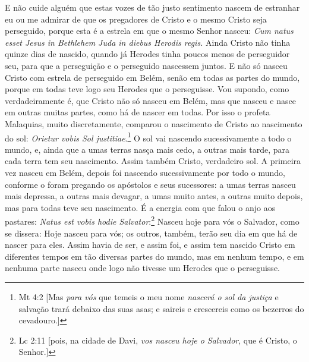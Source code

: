 E não cuide alguém que estas vozes de tão justo sentimento nascem de
estranhar eu ou me admirar de que os pregadores de Cristo e o mesmo
Cristo seja perseguido, porque esta é a estrela em que o mesmo Senhor
nasceu: \emph{Cum natus esset Jesus in Bethlehem Juda in diebus Herodis
regis.} Ainda Cristo não tinha quinze dias de nascido, quando já Herodes
tinha poucos menos de perseguidor seu, para que a perseguição e o
perseguido nascessem juntos. E não só nasceu Cristo com estrela de
perseguido em Belém, senão em todas as partes do mundo, porque em todas
teve logo seu Herodes que o perseguisse. Vou supondo, como
verdadeiramente é, que Cristo não só nasceu em Belém, mas que nasceu e
nasce em outras muitas partes, como há de nascer em todas. Por isso o
profeta Malaquias, muito discretamente, comparou o nascimento de Cristo
ao nascimento do sol: \emph{Orietur vobis Sol justitiae}.\footnote{Mt 4:2 [Mas \emph{para vós} que temeis o meu nome \emph{nascerá o sol da justiça} e salvação trará debaixo das
suas asas; e saireis e crescereis como os bezerros do cevadouro.]} O
sol vai nascendo sucessivamente a todo o mundo, e, ainda que a umas
terras nasça mais cedo, a outras mais tarde, para cada terra tem seu
nascimento. Assim também Cristo, verdadeiro sol. A primeira vez nasceu
em Belém, depois foi nascendo sucessivamente por todo o mundo, conforme
o foram pregando os apóstolos e seus sucessores: a umas terras nasceu
mais depressa, a outras mais devagar, a umas muito antes, a outras muito
depois, mas para todas teve seu nascimento. É a energia com que falou o
anjo aos pastares: \emph{Natus est vobis hodie Salvator}:\footnote{Lc 2:11 [pois, na cidade de Davi, \emph{vos nasceu hoje o Salvador}, que é Cristo, o Senhor.]}
Nasceu hoje para vós o Salvador, como se dissera: Hoje nasceu
para vós; os outros, também, terão seu dia em que há de nascer para
eles. Assim havia de ser, e assim foi, e assim tem nascido Cristo em
diferentes tempos em tão diversas partes do mundo, mas em nenhum tempo,
e em nenhuma parte nasceu onde logo não tivesse um Herodes que o
perseguisse.

